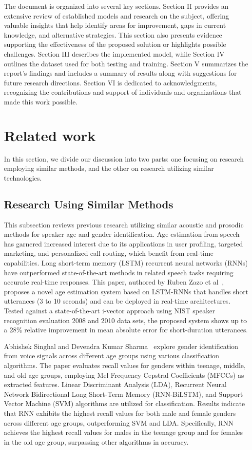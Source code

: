 \documentclass[conference, 10pt,onecolumn]{IEEEtran}
\begin{document}
The document is organized into several key sections. Section II provides an extensive review of established models and research on the subject, offering valuable insights that help identify areas for improvement, gaps in current knowledge, and alternative strategies. This section also presents evidence supporting the effectiveness of the proposed solution or highlights possible challenges. Section III describes the implemented model, while Section IV outlines the dataset used for both testing and training. Section V summarizes the report's findings and includes a summary of results along with suggestions for future research directions. Section VI is dedicated to acknowledgments, recognizing the contributions and support of individuals and organizations that made this work possible.

\section{Related work}
In this section, we divide our discussion into two parts: one focusing on research employing similar methods, and the other on research utilizing similar technologies.
\subsection{Research Using Similar Methods}
This subsection reviews previous research utilizing similar acoustic and prosodic methods for speaker age and gender identification. Age estimation from speech has garnered increased interest due to its applications in user profiling, targeted marketing, and personalized call routing, which benefit from real-time capabilities. Long short-term memory (LSTM) recurrent neural networks (RNNs) have outperformed state-of-the-art methods in related speech tasks requiring accurate real-time responses. This paper, authored by Ruben Zazo et al~\cite{zazo2018age}, proposes a novel age estimation system based on LSTM-RNNs that handles short utterances (3 to 10 seconds) and can be deployed in real-time architectures. Tested against a state-of-the-art i-vector approach using NIST speaker recognition evaluation 2008 and 2010 data sets, the proposed system shows up to a 28\% relative improvement in mean absolute error for short-duration utterances.

Abhishek Singhal and Devendra Kumar Sharma~\cite{abdi2010principal} explore gender identification from voice signals across different age groups using various classification algorithms. The paper evaluates recall values for genders within teenage, middle, and old age groups, employing Mel Frequency Cepstral Coefficients (MFCCs) as extracted features. Linear Discriminant Analysis (LDA), Recurrent Neural Network Bidirectional Long Short-Term Memory (RNN-BiLSTM), and Support Vector Machine (SVM) algorithms are utilized for classification. Results indicate that RNN exhibits the highest recall values for both male and female genders across different age groups, outperforming SVM and LDA. Specifically, RNN achieves the highest recall values for males in the teenage group and for females in the old age group, surpassing other algorithms in accuracy.
\end{document}

